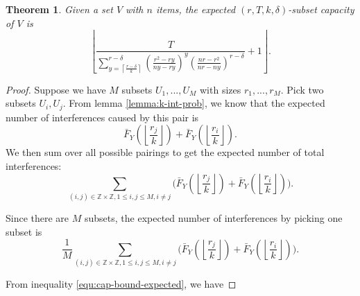\documentclass[10pt]{extarticle}
\newcommand{\Z}{\mathbb{Z}}
\newtheorem{theorem}{Theorem}
\theoremstyle{definition}
\begin{document}
\begin{theorem}
    Given a set $V$ with $n$ items, the expected $(r,T,k,\delta)$-subset capacity of $V$ is 
    \begin{equation*}
        \left\lfloor \frac{T}{\sum_{y = \left\lceil \frac{r-\delta}{k} \right\rceil}^{r-\delta} \left(\frac{r^2 - ry}{ny-ry}\right)^{y} \left(\frac{nr-r^2}{nr-ny}\right)^{r-\delta}} + 1 \right\rfloor.
    \end{equation*}
\end{theorem}

\begin{proof}
    Suppose we have $M$ subsets $U_1,...,U_M$ with sizes $r_1,...,r_M$. Pick two subsets $U_i,U_j$. From lemma \ref{lemma:k-int-prob}, we know that the expected number of interferences caused by this pair is
    $$
    \bar{F}_Y\left(\left\lfloor \frac{r_j}{k} \right\rfloor\right) + \bar{F}_Y\left(\left\lfloor \frac{r_i}{k} \right\rfloor\right).
    $$
    We then sum over all possible pairings to get the expected number of total interferences:
    $$
    \sum_{(i,j) \in \Z\times\Z, 1 \le i,j \le M, i \ne j} \Biggl( \bar{F}_Y\left(\left\lfloor \frac{r_j}{k} \right\rfloor\right) + \bar{F}_Y\left(\left\lfloor \frac{r_i}{k} \right\rfloor\right) \Biggr).
    $$

\noindent Since there are $M$ subsets, the expected number of interferences by picking one subset is
    $$
    \frac{1}{M} \sum_{(i,j) \in \Z\times\Z, 1 \le i,j \le M, i \ne j}  \Biggl( \bar{F}_Y\left(\left\lfloor \frac{r_j}{k} \right\rfloor\right) + \bar{F}_Y\left(\left\lfloor \frac{r_i}{k} \right\rfloor\right) \Biggr).
    $$

\noindent From inequality \ref{equ:cap-bound-expected}, we have 


\end{proof}
\end{document}
